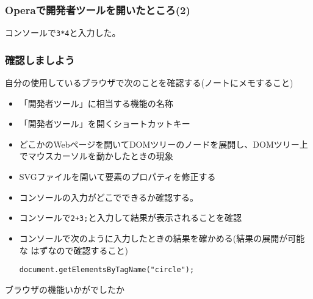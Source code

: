 \begin{frame}[containsverbatim]
 \frametitle{Operaで開発者ツールを開いたところ(2)}
 コンソールで\texttt{3*4}と入力した。
\end{frame}
\fi
\begin{frame}[containsverbatim]
 \frametitle{確認しましよう}
 自分の使用しているブラウザで次のことを確認する(ノートにメモすること)
 \begin{itemize}
  \item 「開発者ツール」に相当する機能の名称
  \item 「開発者ツール」を開くショートカットキー
  \item どこかのWebページを開いてDOMツリーのノードを展開し、DOMツリー上
        でマウスカーソルを動かしたときの現象
  \item SVGファイルを開いて要素のプロパティを修正する
  \item コンソールの入力がどこでできるか確認する。
  \item コンソールで\texttt{2+3;}と入力して結果が表示されることを確認
  \item コンソールで次のように入力したときの結果を確かめる(結果の展開が可能な
        はずなので確認すること)

        \texttt{document.getElementsByTagName("circle");}
 \end{itemize}
 ブラウザの機能いかがでしたか
 \end{frame}

\begin{frame}[containsverbatim]
 \frametitle{}
\end{frame}
